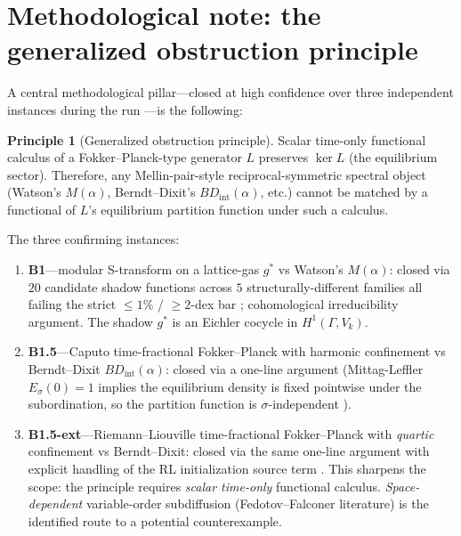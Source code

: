 \documentclass[11pt,reqno]{amsart}
\theoremstyle{definition}
\newtheorem{principle}[theorem]{Principle}
\begin{document}
\section{Methodological note: the generalized obstruction principle}\label{sec:obstruction}

A central methodological pillar---closed at high confidence over
three independent instances during the run
\cite[diaries~19, 35, 37]{ProjectC}---is the following:

\begin{principle}[Generalized obstruction principle]\label{prin:obstruction}
Scalar time-only functional calculus of a Fokker--Planck-type
generator $L$ preserves $\ker L$ (the equilibrium sector).
Therefore, any Mellin-pair-style reciprocal-symmetric spectral
object (Watson's $M(\alpha)$, Berndt--Dixit's
$BD_{\mathrm{int}}(\alpha)$, etc.) cannot be matched by a functional
of $L$'s equilibrium partition function under such a calculus.
\end{principle}

The three confirming instances:
\begin{enumerate}
\item \textbf{B1}---modular S-transform on a lattice-gas $g^*$ vs
  Watson's $M(\alpha)$: closed via $20$ candidate shadow functions
  across $5$ structurally-different families all failing the strict
  $\le 1\%$ / $\ge 2$-dex bar \cite[diary~19]{ProjectC};
  cohomological irreducibility argument. The shadow $g^*$ is an
  Eichler cocycle in $H^1(\Gamma, V_k)$.
\item \textbf{B1.5}---Caputo time-fractional Fokker--Planck with
  harmonic confinement vs Berndt--Dixit
  $BD_{\mathrm{int}}(\alpha)$: closed via a one-line argument
  (Mittag-Leffler $E_\sigma(0) = 1$ implies the equilibrium density
  is fixed pointwise under the subordination, so the partition
  function is $\sigma$-independent \cite[diary~35]{ProjectC}).
\item \textbf{B1.5-ext}---Riemann--Liouville time-fractional
  Fokker--Planck with \emph{quartic} confinement vs Berndt--Dixit:
  closed via the same one-line argument with explicit handling of
  the RL initialization source term \cite[diary~37]{ProjectC}. This
  sharpens the scope: the principle requires \emph{scalar time-only}
  functional calculus. \emph{Space-dependent} variable-order
  subdiffusion (Fedotov--Falconer literature) is the identified
  route to a potential counterexample.
\end{enumerate}
\end{document}
